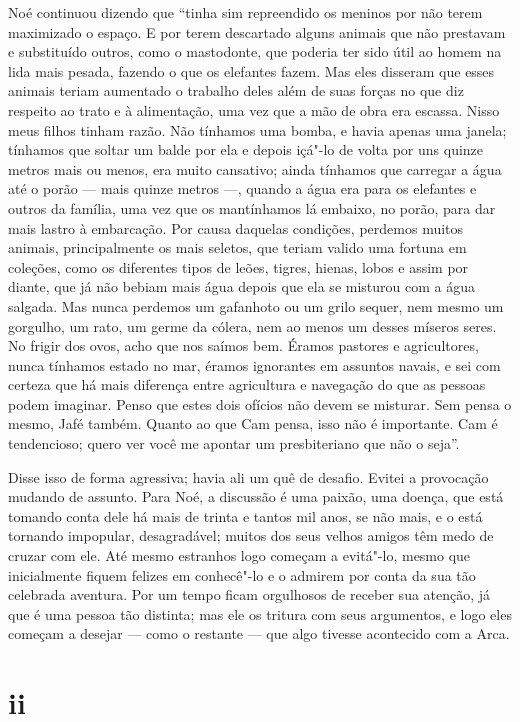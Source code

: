 Noé continuou dizendo que “tinha sim repreendido os meninos por não terem
maximizado o espaço. E por terem descartado alguns animais que não
prestavam e substituído outros, como o mastodonte, que poderia ter sido útil ao
homem na lida mais pesada, fazendo o que os elefantes fazem. Mas eles disseram que
esses animais teriam aumentado o trabalho deles além de suas forças no que diz
respeito ao trato e à alimentação, uma vez que a mão de obra era escassa.
Nisso meus filhos tinham razão. Não tínhamos uma bomba, e havia apenas uma janela;
tínhamos que soltar um balde por ela e depois içá"-lo de volta por uns quinze metros
mais ou menos, era muito cansativo; ainda tínhamos que carregar a
água até o porão --- mais quinze metros ---, quando a água era para os elefantes e
outros da família, uma vez que os mantínhamos lá embaixo, no porão, para dar mais
lastro à embarcação. Por causa daquelas condições, perdemos muitos animais,
principalmente os mais seletos, que teriam valido uma fortuna em coleções, como os
diferentes tipos de leões, tigres, hienas, lobos e assim por diante, que já não
bebiam mais água depois que ela se misturou com a água salgada. Mas nunca
perdemos um gafanhoto ou um grilo sequer, nem mesmo um gorgulho, um rato, um germe
da cólera, nem ao menos um desses míseros seres. No frigir dos ovos, acho que nos
saímos bem. Éramos pastores e agricultores, nunca tínhamos estado no mar,
éramos ignorantes em assuntos navais, e sei com certeza que há mais
diferença entre agricultura e navegação do que as pessoas podem imaginar. Penso que
estes dois ofícios não devem se misturar. Sem pensa o mesmo, Jafé
também. Quanto ao que Cam pensa, isso não é importante. Cam é tendencioso; 
quero ver você me apontar um presbiteriano que não o seja”.     

Disse isso de forma agressiva; havia ali um quê de desafio. Evitei a
provocação mudando de assunto. Para Noé, a discussão é uma paixão, uma doença, que
está tomando conta dele há mais de trinta e tantos mil anos, se não mais, e o está
tornando impopular, desagradável; muitos dos seus velhos amigos têm medo de
cruzar com ele. Até mesmo estranhos logo começam a evitá"-lo, mesmo que
inicialmente fiquem felizes em conhecê"-lo e o admirem por conta da sua tão
celebrada aventura. Por um tempo ficam orgulhosos de receber sua atenção, já que
é uma pessoa tão distinta; mas ele os tritura com seus argumentos, e logo eles começam
a desejar --- como o restante --- que algo tivesse acontecido com a Arca.

\section{ii}

